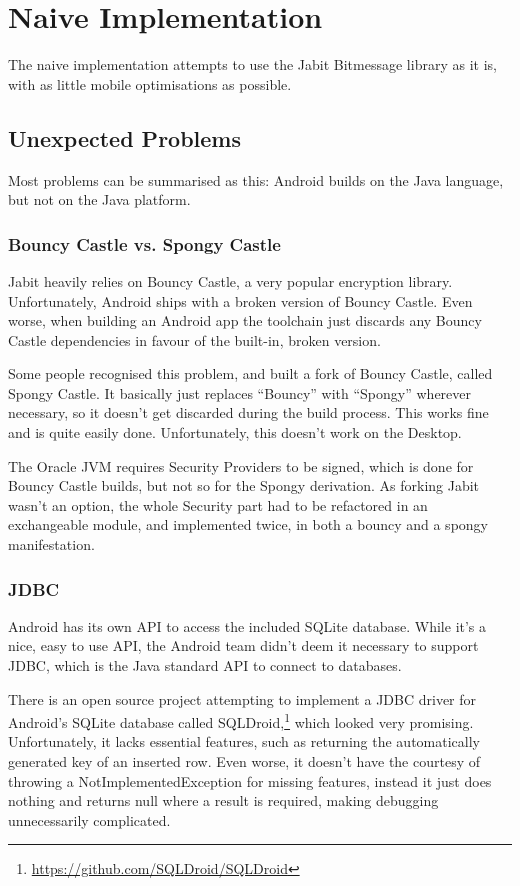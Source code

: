 \documentclass{bfh}
\begin{document}
  \section{Naive Implementation}
  
  The naive implementation attempts to use the Jabit Bitmessage library as it is, with as little mobile optimisations as possible.

  \subsection{Unexpected Problems}
  Most problems can be summarised as this: Android builds on the Java language, but not on the Java platform.
  
  \subsubsection{Bouncy Castle vs. Spongy Castle}
  \label{subsec:bcvssc}
  Jabit heavily relies on Bouncy Castle, a very popular encryption library.\cite{bouncy} Unfortunately, Android ships with a broken version of Bouncy Castle. Even worse, when building an Android app the toolchain just discards any Bouncy Castle dependencies in favour of the built-in, broken version.

  Some people recognised this problem, and built a fork of Bouncy Castle, called Spongy Castle. It basically just replaces “Bouncy” with “Spongy” wherever necessary, so it doesn’t get discarded during the build process. This works fine and is quite easily done. Unfortunately, this doesn’t work on the Desktop.

  The Oracle JVM requires Security Providers to be signed, which is done for Bouncy Castle builds, but not so for the Spongy derivation. As forking Jabit wasn’t an option, the whole Security part had to be refactored in an exchangeable module, and implemented twice, in both a bouncy and a spongy manifestation.

  \subsubsection{JDBC}
  Android has its own API to access the included SQLite database. While it’s a nice, easy to use \ac{API}, the Android team didn’t deem it necessary to support \ac{JDBC}, which is the Java standard API to connect to databases.

  There is an open source project attempting to implement a \ac{JDBC} driver for Android’s SQLite database called SQLDroid,\footnote{\url{https://github.com/SQLDroid/SQLDroid}} which looked very promising. Unfortunately, it lacks essential features, such as returning the automatically generated key of an inserted row. Even worse, it doesn't have the courtesy of throwing a NotImplementedException for missing features, instead it just does nothing and returns null where a result is required, making debugging unnecessarily complicated.
\end{document}
